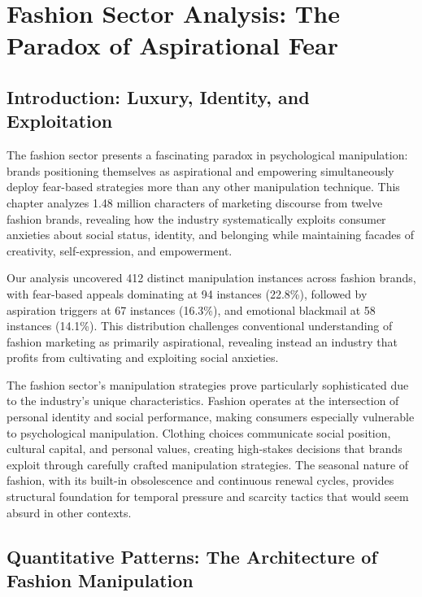 
\chapter{Fashion Sector Analysis: The Paradox of Aspirational Fear}
\label{ch:fashion}

\section{Introduction: Luxury, Identity, and Exploitation}
\label{sec:fashion_intro}

The fashion sector presents a fascinating paradox in psychological manipulation: brands positioning themselves as aspirational and empowering simultaneously deploy fear-based strategies more than any other manipulation technique. This chapter analyzes 1.48 million characters of marketing discourse from twelve fashion brands, revealing how the industry systematically exploits consumer anxieties about social status, identity, and belonging while maintaining facades of creativity, self-expression, and empowerment.

Our analysis uncovered 412 distinct manipulation instances across fashion brands, with fear-based appeals dominating at 94 instances (22.8\%), followed by aspiration triggers at 67 instances (16.3\%), and emotional blackmail at 58 instances (14.1\%). This distribution challenges conventional understanding of fashion marketing as primarily aspirational, revealing instead an industry that profits from cultivating and exploiting social anxieties.

The fashion sector's manipulation strategies prove particularly sophisticated due to the industry's unique characteristics. Fashion operates at the intersection of personal identity and social performance, making consumers especially vulnerable to psychological manipulation. Clothing choices communicate social position, cultural capital, and personal values, creating high-stakes decisions that brands exploit through carefully crafted manipulation strategies. The seasonal nature of fashion, with its built-in obsolescence and continuous renewal cycles, provides structural foundation for temporal pressure and scarcity tactics that would seem absurd in other contexts.

\section{Quantitative Patterns: The Architecture of Fashion Manipulation}
\label{sec:fashion_quant}

